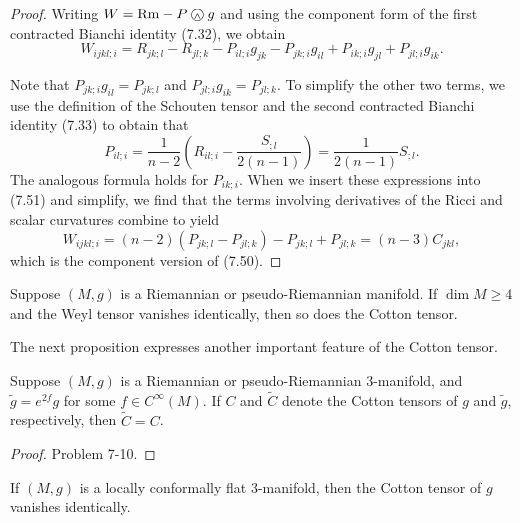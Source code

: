 \begin{proof}
Writing $W = \mathrm{Rm} - P \owedge g$ and using the component form of the first contracted Bianchi identity (7.32), we obtain
\begin{equation}
W_{ijkl;i} = R_{jk;l} - R_{jl;k} - P_{il;i} g_{jk} - P_{jk;i} g_{il} + P_{ik;i} g_{jl} + P_{jl;i} g_{ik}.
\tag{7.51}
\end{equation}

Note that $P_{jk;i} g_{il} = P_{jk;l}$ and $P_{jl;i} g_{ik} = P_{jl;k}$. To simplify the other two terms, we use the definition of the Schouten tensor and the second contracted Bianchi identity (7.33) to obtain that
\[
P_{il;i} = \frac{1}{n-2}\left(R_{il;i} - \frac{S_{;l}}{2(n-1)}\right) = \frac{1}{2(n-1)} S_{;l}.
\]
The analogous formula holds for $P_{ik;i}$. When we insert these expressions into (7.51) and simplify, we find that the terms involving derivatives of the Ricci and scalar curvatures combine to yield
\[
W_{ijkl;i} = (n-2)(P_{jk;l} - P_{jl;k}) - P_{jk;l} + P_{jl;k} = (n-3)C_{jkl},
\]
which is the component version of (7.50).
\end{proof}

\begin{corollary}
\label{cor:weyl-cotton-vanish-dimension-4}
Suppose $(M,g)$ is a Riemannian or pseudo-Riemannian manifold. If $\dim M \geq 4$ and the Weyl tensor vanishes identically, then so does the Cotton tensor.
\end{corollary}

The next proposition expresses another important feature of the Cotton tensor.

\begin{proposition}
\label{prop:conformal-invariance-cotton-dim3}
Suppose $(M,g)$ is a Riemannian or pseudo-Riemannian 3-manifold, and $\tilde{g} = e^{2f} g$ for some $f \in C^\infty(M)$. If $C$ and $\tilde{C}$ denote the Cotton tensors of $g$ and $\tilde{g}$, respectively, then $\tilde{C} = C$.
\end{proposition}

\begin{proof}
Problem 7-10.
\end{proof}

\begin{corollary}
\label{cor:cotton-tensor-vanishes-conformally-flat}
If $(M,g)$ is a locally conformally flat 3-manifold, then the Cotton tensor of $g$ vanishes identically.
\end{corollary}

